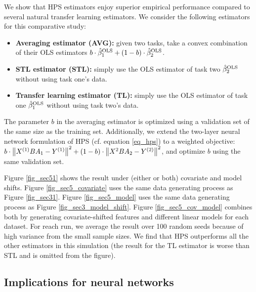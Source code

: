We show that HPS estimators enjoy superior empirical performance compared to several natural transfer learning estimators.
We consider the following estimators for this comparative study:
\begin{itemize}
    \item {\bf Averaging estimator (AVG):} given two tasks, take a convex combination of their OLS estimators $b \cdot \hat{\beta}^{\textup{OLS}}_1 + (1 - b) \cdot \hat{\beta}^{\textup{OLS}}_2$.
    \item {\bf STL estimator (STL):} simply use the OLS estimator of task two $\hat{\beta}^{\textup{OLS}}_2$ without using task one's data.
    \item {\bf Transfer learning estimator (TL):} simply use the OLS estimator of task one $\hat{\beta}^{\textup{OLS}}_1$ without using task two's data.
\end{itemize}
The parameter $b$ in the averaging estimator is optimized using a validation set of the same size as the training set.
Additionally, we extend the two-layer neural network formulation of HPS (cf. equation \eqref{eq_hps}) to a weighted objective:
$b \cdot \left\| X^{(1)} B A_1 - Y^{(1)} \right\|^2 + (1 - b) \cdot  \left\| X^{2} B A_2 - Y^{(2)} \right\|^2$, and optimize $b$ using the same validation set.

Figure \ref{fig_sec51} shows the result under (either or both) covariate and model shifts.
Figure \ref{fig_sec5_covariate} uses the same data generating process as Figure \ref{fig_sec31}.
Figure \ref{fig_sec5_model} uses the same data generating process as Figure \ref{fig_sec3_model_shift}.
Figure \ref{fig_sec5_cov_model} combines both by generating covariate-shifted features and different linear models for each dataset.
For reach run, we average the result over 100 random seeds because of high variance from the small sample sizes.
We find that HPS outperforms all the other estimators in this simulation (the result for the TL estimator is worse than STL and is omitted from the figure).



\subsection{Implications for neural networks}

